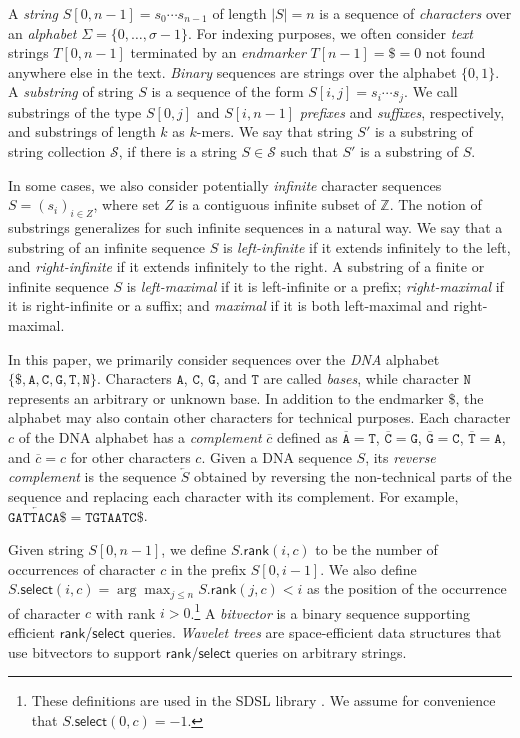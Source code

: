 \documentclass[a4paper,UKenglish]{lipics-v2016}
\newcommand{\set}[1]{\ensuremath{\{ #1 \}}}
\newcommand{\abs}[1]{\ensuremath{\lvert #1 \rvert}}
\newcommand{\dnaseq}[1]{\ensuremath{\mathtt{#1}}}
\newcommand{\baseA}{\dnaseq{A}}
\newcommand{\baseC}{\dnaseq{C}}
\newcommand{\baseG}{\dnaseq{G}}
\newcommand{\baseT}{\dnaseq{T}}
\newcommand{\baseN}{\dnaseq{N}}
\newcommand{\dnacomp}[1]{\ensuremath{\overline{#1}}}
\newcommand{\revcomp}[1]{\ensuremath{\overleftarrow{#1}}}
\newcommand{\rank}{\ensuremath{\mathsf{rank}}}
\newcommand{\select}{\ensuremath{\mathsf{select}}}
\newcommand{\kmer}[1]{$#1$\nobreakdash-mer}
\begin{document}
A \emph{string} $S[0, n-1] = s_{0} \dotsm s_{n-1}$ of length $\abs{S} = n$ is a sequence of \emph{characters} over an \emph{alphabet} $\Sigma = \set{0, \dotsc, \sigma - 1}$. For indexing purposes, we often consider \emph{text} strings $T[0, n-1]$ terminated by an \emph{endmarker} $T[n-1] = \$ = 0$ not found anywhere else in the text. \emph{Binary} sequences are strings over the alphabet $\set{0, 1}$. A \emph{substring} of string $S$ is a sequence of the form $S[i, j] = s_{i} \dotsm s_{j}$. We call substrings of the type $S[0, j]$ and $S[i, n-1]$ \emph{prefixes} and \emph{suffixes}, respectively, and substrings of length $k$ as \kmer{k}s. We say that string $S'$ is a substring of string collection $\mathcal{S}$, if there is a string $S \in \mathcal{S}$ such that $S'$ is a substring of $S$.

In some cases, we also consider potentially \emph{infinite} character sequences $S = (s_{i})_{i \in Z}$, where set $Z$ is a contiguous infinite subset of $\mathbb{Z}$. The notion of substrings generalizes for such infinite sequences in a natural way. We say that a substring of an infinite sequence $S$ is \emph{left-infinite} if it extends infinitely to the left, and \emph{right-infinite} if it extends infinitely to the right. A substring of a finite or infinite sequence $S$ is \emph{left-maximal} if it is left-infinite or a prefix; \emph{right-maximal} if it is right-infinite or a suffix; and \emph{maximal} if it is both left-maximal and right-maximal.

In this paper, we primarily consider sequences over the \emph{DNA} alphabet $\set{\$, \baseA, \baseC, \baseG, \baseT, \baseN}$. Characters $\baseA$, $\baseC$, $\baseG$, and $\baseT$ are called \emph{bases}, while character $\baseN$ represents an arbitrary or unknown base. In addition to the endmarker $\$$, the alphabet may also contain other characters for technical purposes. Each character $c$ of the DNA alphabet has a \emph{complement} $\dnacomp{c}$ defined as $\dnacomp{\baseA} = \baseT$, $\dnacomp{\baseC} = \baseG$, $\dnacomp{\baseG} = \baseC$, $\dnacomp{\baseT} = \baseA$, and $\dnacomp{c} = c$ for other characters $c$. Given a DNA sequence $S$, its \emph{reverse complement} is the sequence $\revcomp{S}$ obtained by reversing the non-technical parts of the sequence and replacing each character with its complement. For example, $\revcomp{\dnaseq{GATTACA}\$} = \dnaseq{TGTAATC}\$$.

Given string $S[0, n-1]$, we define $S.\rank(i, c)$ to be the number of occurrences of character $c$ in the prefix $S[0, i-1]$. We also define $S.\select(i, c) = \arg \max_{j \le n} S.\rank(j, c) < i$ as the position of the occurrence of character $c$ with rank $i > 0$.\footnote{These definitions are used in the SDSL library \cite{Gog2014b}. We assume for convenience that $S.\select(0, c) = -1$.} A \emph{bitvector} is a binary sequence supporting efficient $\rank$/$\select$ queries. \emph{Wavelet trees} \cite{Grossi2003} are space-efficient data structures that use bitvectors to support $\rank$/$\select$ queries on arbitrary strings.
\end{document}
